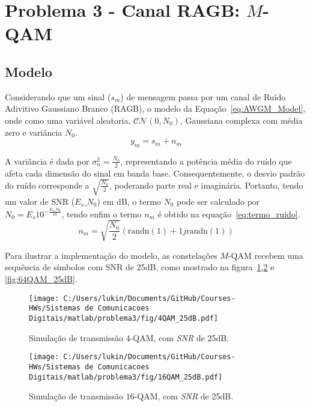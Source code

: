 \section{Problema 3 - Canal RAGB: \texorpdfstring{$M$}{M}-QAM}
\subsection{Modelo}
Considerando que um sinal ($s_m$) de mensagem passa por um canal de Ruído Adivitivo Gaussiano Branco (RAGB), o modelo da Equação~\ref{eq:AWGM_Model}, onde como uma variável aleatoria, $\mathcal{C} \mathcal{N} (0,N_0)$, Gaussiana complexa com média zero e variância $N_0$.
\begin{equation}
    y_m = s_m + n_m
    \label{eq:AWGM_Model}
\end{equation}

A variância é dada por $\sigma_{n}^{2} = \frac{N_0}{2}$, representando a potência média do ruído que afeta cada dimensão do sinal em banda base. Consequentemente, o desvio padrão do ruído corresponde a $\sqrt{\frac{N_0}{2}}$, poderando parte real e imaginária. Portanto, tendo um valor de SNR ($E_s\_N_0$) em dB, o termo $N_0$ pode ser calculado por $N_0= E_s 10^{-\frac{E_s\_N_0}{10}}$, tendo enfim o termo $n_m$ é obtido na equação~\ref{eq:termo_ruido}.
\begin{equation}
    n_m = \sqrt{\frac{N_0}{2}} \left(\text{randn}(1) + 1j \text{randn}(1)\right)
    \label{eq:termo_ruido}
\end{equation}

Para ilustrar a implementação do modelo, as constelações $M$-QAM recebem uma sequência de símbolos com SNR de 25dB, como mostrado na figura~\ref{fig:4QAM_25dB},\ref{fig:16QAM_25dB} e \ref{fig:64QAM_25dB}.

\begin{figure}[!ht]
    \centering
    \texttt{[image: C:/Users/lukin/Documents/GitHub/Courses-HWs/Sistemas de Comunicacoes Digitais/matlab/problema3/fig/4QAM\_25dB.pdf]}
    \caption{Simulação de transmissão $4$-QAM, com \textit{SNR} de 25dB.}
    \label{fig:4QAM_25dB}
\end{figure}

\begin{figure}[!ht]
    \centering
    \texttt{[image: C:/Users/lukin/Documents/GitHub/Courses-HWs/Sistemas de Comunicacoes Digitais/matlab/problema3/fig/16QAM\_25dB.pdf]}
    \caption{Simulação de transmissão $16$-QAM, com \textit{SNR} de 25dB.}
    \label{fig:16QAM_25dB}
\end{figure}

